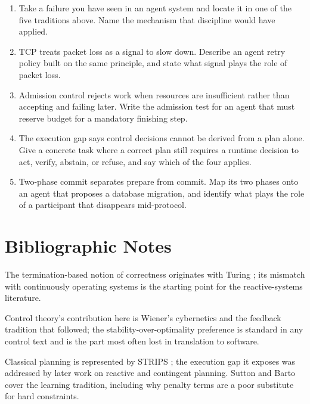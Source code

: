 \documentclass[11pt]{book}
\begin{document}
\begin{enumerate}
\item Take a failure you have seen in an agent system and locate it in one of the five traditions above. Name the mechanism that discipline would have applied.

\item TCP treats packet loss as a signal to slow down. Describe an agent retry policy built on the same principle, and state what signal plays the role of packet loss.

\item Admission control rejects work when resources are insufficient rather than accepting and failing later. Write the admission test for an agent that must reserve budget for a mandatory finishing step.

\item The execution gap says control decisions cannot be derived from a plan alone. Give a concrete task where a correct plan still requires a runtime decision to act, verify, abstain, or refuse, and say which of the four applies.

\item Two-phase commit separates prepare from commit. Map its two phases onto an agent that proposes a database migration, and identify what plays the role of a participant that disappears mid-protocol.
\end{enumerate}

\section*{Bibliographic Notes}

The termination-based notion of correctness originates with Turing \cite{turing1936computable}; its mismatch with continuously operating systems is the starting point for the reactive-systems literature.

Control theory's contribution here is Wiener's cybernetics \cite{wiener1948} and the feedback tradition that followed; the stability-over-optimality preference is standard in any control text and is the part most often lost in translation to software.

Classical planning is represented by STRIPS \cite{fikes1971strips}; the execution gap it exposes was addressed by later work on reactive and contingent planning. Sutton and Barto \cite{sutton2018reinforcement} cover the learning tradition, including why penalty terms are a poor substitute for hard constraints.
\end{document}
